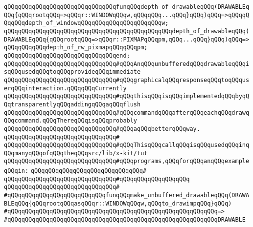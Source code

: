 \newline
\verb|qQQqqQQqqQQqqQQqqQQqqQQqqQQqqQQqfunqQQqdepth_of_drawableqQQq(DRAWABLEqQQq{qQQqrootqQQq=>qQQqr::WINDOWqQQqw,qQQqqQQq...qQQq}qQQq)qQQq=>qQQqqQQqqQQqdepth_of_windowqQQqqQQqqQQqqQQqqQQqqQQqw;|\newline
\verb|qQQqqQQqqQQqqQQqqQQqqQQqqQQqqQQqqQQqqQQqqQQqqQQqdepth_of_drawableqQQq(DRAWABLEqQQq{qQQqrootqQQq=>qQQqr::PIXMAPqQQqpm,qQQq...qQQq}qQQq)qQQq=>qQQqqQQqqQQqdepth_of_rw_pixmapqQQqqQQqpm;|\newline
\verb|qQQqqQQqqQQqqQQqqQQqqQQqqQQqqQQqend;|\newline
\newline
\verb|qQQqqQQqqQQqqQQqqQQqqQQqqQQqqQQq#qQQqAnqQQqunbufferedqQQqdrawableqQQqisqQQqusedqQQqtoqQQqprovideqQQqimmediate|\newline
\verb|qQQqqQQqqQQqqQQqqQQqqQQqqQQqqQQq#qQQqgraphicalqQQqresponseqQQqtoqQQquserqQQqinteraction.qQQqqQQqCurrently|\newline
\verb|qQQqqQQqqQQqqQQqqQQqqQQqqQQqqQQq#qQQqthisqQQqisqQQqimplementedqQQqbyqQQqtransparentlyqQQqaddingqQQqaqQQqflush|\newline
\verb|qQQqqQQqqQQqqQQqqQQqqQQqqQQqqQQq#qQQqcommandqQQqafterqQQqeachqQQqdrawqQQqcommand.qQQqThereqQQqisqQQqprobably|\newline
\verb|qQQqqQQqqQQqqQQqqQQqqQQqqQQqqQQq#qQQqaqQQqbetterqQQqway.|\newline
\verb|qQQqqQQqqQQqqQQqqQQqqQQqqQQqqQQq#|\newline
\verb|qQQqqQQqqQQqqQQqqQQqqQQqqQQqqQQq#qQQqThisqQQqcallqQQqisqQQqusedqQQqinqQQqmanyqQQqofqQQqtheqQQqsrc/lib/x-kit/tut|\newline
\verb|qQQqqQQqqQQqqQQqqQQqqQQqqQQqqQQq#qQQqprograms,qQQqforqQQqanqQQqexampleqQQqin:|\newline
\verb|qQQqqQQqqQQqqQQqqQQqqQQqqQQqqQQq#|\newline
\verb|qQQqqQQqqQQqqQQqqQQqqQQqqQQqqQQq#qQQqqQQqqQQqqQQqqQQq|\newline
\verb|qQQqqQQqqQQqqQQqqQQqqQQqqQQqqQQq#|\newline
\verb|#qQQqqQQqqQQqqQQqqQQqqQQqqQQqfunqQQqmake_unbuffered_drawableqQQq(DRAWABLEqQQq{qQQqrootqQQqasqQQqr::WINDOWqQQqw,qQQqto_drawimpqQQq}qQQq)|\newline
\verb|#qQQqqQQqqQQqqQQqqQQqqQQqqQQqqQQqqQQqqQQqqQQqqQQqqQQqqQQqqQQq=>|\newline
\verb|#qQQqqQQqqQQqqQQqqQQqqQQqqQQqqQQqqQQqqQQqqQQqqQQqqQQqqQQqqQQqDRAWABLE|\newline
